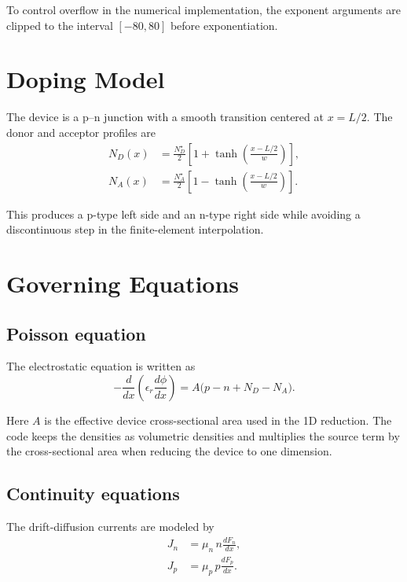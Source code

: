 \documentclass[11pt]{article}
\begin{document}
To control overflow in the numerical implementation, the exponent arguments are
clipped to the interval $[-80,80]$ before exponentiation.

\section{Doping Model}

The device is a p--n junction with a smooth transition centered at $x=L/2$.
The donor and acceptor profiles are
\begin{align}
    N_D(x) &= \frac{N_D^\star}{2}
    \left[
        1 + \tanh\!\left(\frac{x-L/2}{w}\right)
    \right], \\
    N_A(x) &= \frac{N_A^\star}{2}
    \left[
        1 - \tanh\!\left(\frac{x-L/2}{w}\right)
    \right].
\end{align}

This produces a p-type left side and an n-type right side while avoiding a
discontinuous step in the finite-element interpolation.

\section{Governing Equations}

\subsection{Poisson equation}

The electrostatic equation is written as
\begin{equation}
    -\frac{d}{dx}
    \left(
        \epsilon_r \frac{d\phi}{dx}
    \right)
    =
    A \bigl(p - n + N_D - N_A\bigr).
\end{equation}

Here $A$ is the effective device cross-sectional area used in the 1D reduction.
The code keeps the densities as volumetric densities and multiplies the source
term by the cross-sectional area when reducing the device to one dimension.

\subsection{Continuity equations}

The drift-diffusion currents are modeled by
\begin{align}
    J_n &= \mu_n\, n \frac{dF_n}{dx}, \\
    J_p &= \mu_p\, p \frac{dF_p}{dx}.
\end{align}
\end{document}
